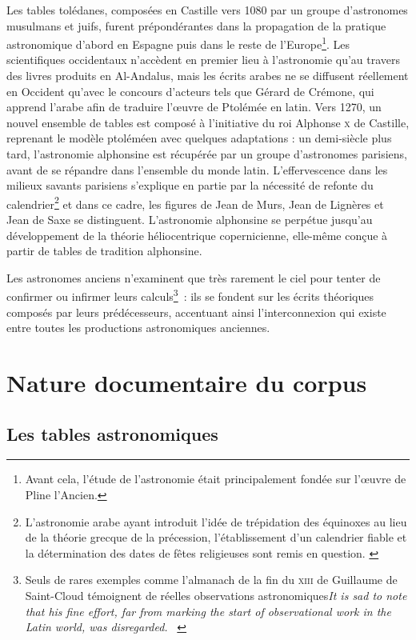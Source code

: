 \documentclass[a4paper,12pt,twoside]{book}
\newcommand{\eng}{\emph}
\newcommand{\XIII}{\textsc{xiii}\ieme{}\xspace}
\newcommand{\g}[1]{\og#1~\fg}
\begin{document}
Les tables tolédanes, composées en Castille vers 1080 par un groupe d'astronomes musulmans et juifs, furent prépondérantes dans la propagation de la pratique astronomique d'abord en Espagne puis dans le reste de l'Europe\footnote{Avant cela, l'étude de l'astronomie était principalement fondée sur l'œuvre de Pline l'Ancien.}. Les scientifiques occidentaux n'accèdent en premier lieu à l'astronomie qu'au travers des livres produits en Al-Andalus, mais les écrits arabes ne se diffusent réellement en Occident qu'avec le concours d'acteurs tels que Gérard de Crémone, qui apprend l'arabe afin de traduire l'œuvre de Ptolémée en latin. Vers 1270, un nouvel ensemble de tables est composé à l'initiative du roi Alphonse \textsc{x} de Castille, reprenant le modèle ptoléméen avec quelques adaptations : un demi-siècle plus tard, l'astronomie alphonsine est récupérée par un groupe d'astronomes parisiens, avant de se répandre dans l'ensemble du monde latin. L'effervescence dans les milieux savants parisiens s'explique en partie par la nécessité de refonte du calendrier\footnote{L'astronomie arabe ayant introduit l'idée de trépidation des équinoxes au lieu de la théorie grecque de la précession, l'établissement d'un calendrier fiable et la détermination des dates de fêtes religieuses sont remis en question. \cite{poulleAstronomesParisiensAu2005}} et dans ce cadre, les figures de Jean de Murs, Jean de Lignères et Jean de Saxe se distinguent. L'astronomie alphonsine se perpétue jusqu'au développement de la théorie héliocentrique copernicienne, elle-même conçue à partir de tables de tradition alphonsine.

Les astronomes anciens n'examinent que très rarement le ciel pour tenter de confirmer ou infirmer leurs calculs\footnote{Seuls de rares exemples comme l'almanach de la fin du \XIII de Guillaume de Saint-Cloud témoignent de réelles observations astronomiques\g{\eng{It is sad to note that his fine effort, far from marking the start of observational work in the Latin world, was disregarded.}} \cite[p.~22]{mercierStudiesTransmissionMedieval2004}}~: ils se fondent sur les écrits théoriques composés par leurs prédécesseurs, accentuant ainsi l'interconnexion qui existe entre toutes les productions astronomiques anciennes.

	\section{Nature documentaire du corpus}
		\subsection{Les tables astronomiques}
\end{document}
